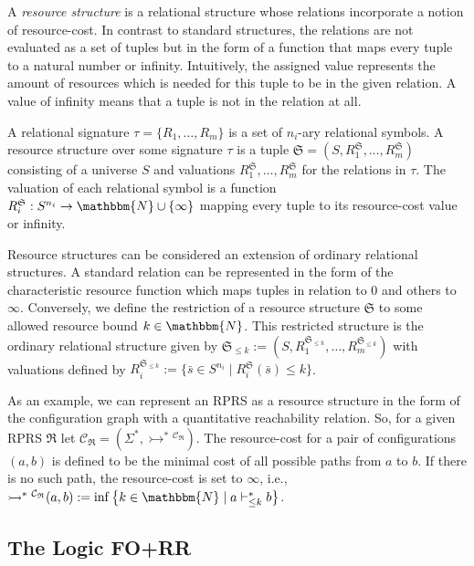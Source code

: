 \documentclass{LMCS}
\newcommand{\nat}{\mathbbm{N}}
\newcommand{\natInf}{\nat \cup \{ \infty \}}
\newcommand{\prsR}{\mathfrak R}
\newcommand{\configstepsLesserCost}[2][*]{\vdash^{#1}_{\le #2}}
\newcommand{\structureS}{\mathfrak S}
\newcommand{\tspathTo}{\rightarrowtail^*}
\newcommand{\RPRS}{\textsf{RPRS}}
\newcommand{\resRep}[1]{\mathcal C_{#1}}
\begin{document}
A \emph{resource structure} is a relational structure whose relations
incorporate a notion of resource-cost. In contrast to standard structures, the
relations are not evaluated as a set of tuples but in the form of a function that
maps every tuple to a natural number or infinity. Intuitively, the assigned
value represents the amount of resources which is needed for this tuple to be in the
given relation. A value of infinity means that a tuple is not in the relation 
at all. 

\begin{defi}
 A relational signature $\tau = \{R_1,\ldots,R_m\}$ is a set of $n_i$-ary
relational symbols. A resource structure over some signature $\tau$ is a tuple
$\structureS = (S,R_1^\structureS,\ldots,R_m^\structureS)$ consisting
of a universe $S$ and  valuations $R_1^\structureS,\ldots,R_m^\structureS$ for
the relations in $\tau$. The valuation of each relational symbol is a function
$R_i^\structureS: S^{n_i} \to \natInf$ mapping every tuple to its resource-cost
value or infinity.
\end{defi}

Resource structures can be considered an extension of ordinary
relational structures. A standard relation can be represented in the form
of the characteristic resource function which maps tuples in relation to
0 and others to $\infty$. Conversely, we define the restriction of a
resource structure $\structureS$ to some allowed resource bound $k
\in\nat$. This restricted structure is the ordinary relational structure
given by $\structureS_{\le k} := (S,R_1^{\structureS_{\le
k}},\ldots,R_m^{\structureS_{\le k}})$ with valuations defined by
$R_i^{\structureS_{\le k}} := \{ \bar s \in S^{n_i} \mid R_i^\structureS(\bar s)
\le k\}$.

As an example, we can represent an \RPRS{} as a resource structure in the form of
the configuration graph with a quantitative reachability relation. So, for a
given \RPRS{} $\prsR$ let $\resRep{\prsR} = (\Sigma^*,\tspathTo{}^{\resRep{\prsR}})$. The
resource-cost for a pair of configurations $(a,b)$ is defined to be the
minimal cost of all possible paths from $a$ to $b$. If there is no such path,
the resource-cost is set to $\infty$, i.e., $\tspathTo{}^{\resRep{\prsR}}(a,b)
:= \inf \left\{ k \in \nat \mid a \configstepsLesserCost{k} b\right\}$.


\subsection{The Logic FO+RR}
\label{subsec:LogicFORR}
\end{document}
